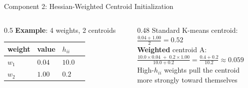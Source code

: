 \begin{frame}{Component 2: Hessian-Weighted Centroid Initialization}
  \begin{columns}[T]
    \begin{column}{0.5\textwidth}
      \small\textbf{Example}: 4 weights, 2 centroids\\[0.3em]
      \begin{tabular}{llll}
        weight & value & $h_{ii}$ \\
        \midrule
        $w_1$ & $0.04$ & $10.0$ \\
        $w_2$ & $1.00$ & $0.2$ \\
      \end{tabular}
    \end{column}
    \begin{column}{0.48\textwidth}
      \small
      Standard K-means centroid:\\
      $\frac{0.04+1.00}{2} = 0.52$\\[0.5em]
      \textbf{Weighted} centroid A:\\
      $\frac{10.0\times0.04\;+\;0.2\times1.00}{10.0+0.2} = \frac{0.4+0.2}{10.2} \approx 0.059$\\[0.5em]
      \textcolor{mycolor}{High-$h_{ii}$ weights pull the centroid\\more strongly toward themselves}
    \end{column}
  \end{columns}
\end{frame}


